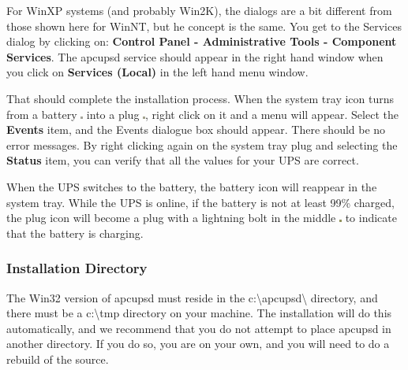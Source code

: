 {{{{{{{{{{For WinXP systems (and probably Win2K), the dialogs are a bit different from
those shown here for WinNT, but he concept is the same. You get to the
Services dialog by clicking on: {\bf Control Panel -\gt{} Administrative Tools
-\gt{} Component Services}. The apcupsd service should appear in the right
hand window when you click on {\bf Services (Local)} in the left hand menu
window.  

That should complete the installation process. When the system tray icon turns
from a battery \includegraphics{./onbatt.eps} into a plug
\includegraphics{./online.eps}, right click on it and a menu will appear.
Select the {\bf Events} item, and the Events dialogue box should appear. There
should be no error messages. By right clicking again on the system tray plug
and selecting the {\bf Status} item, you can verify that all the values for
your UPS are correct.  

When the UPS switches to the battery, the battery icon will reappear in the
system tray. While the UPS is online, if the battery is not at least 99\%
charged, the plug icon will become a plug with a lightning bolt in the middle
\includegraphics{./charging.eps} to indicate that the battery is charging. 

\label{Installation-Directory}

\subsubsection*{Installation Directory}

\label{index-Windows_002c-Installation-Directory-172}
The Win32 version of apcupsd must reside in the
c:\textbackslash{}apcupsd\textbackslash{} directory, and there must be a
c:\textbackslash{}tmp directory on your machine. The installation will do this
automatically, and we recommend that you do not attempt to place apcupsd in
another directory. If you do so, you are on your own, and you will need to do
a rebuild of the source. 

\label{Testing}

}}}}}}}}}}
